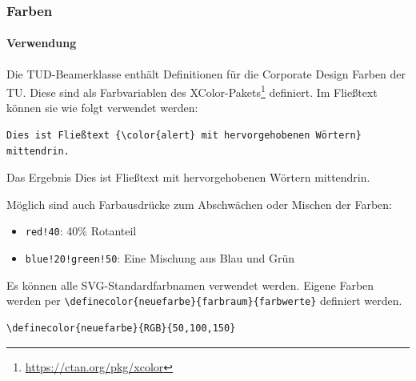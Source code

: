 \documentclass[german,notoc,draft]{tudbeamer}%
\begin{document}
\begin{frame}[fragile]
	\frametitle{Farben}
	\framesubtitle{Verwendung}

	Die TUD-Beamerklasse enthält Definitionen für die Corporate Design Farben der TU. Diese sind als Farbvariablen des XColor-Pakets\footnote{\url{https://ctan.org/pkg/xcolor}} definiert.
	Im Fließtext können sie wie folgt verwendet werden:	
	\begin{lstlisting}[gobble=4,style=latex,numbers=none]
		Dies ist Fließtext {\color{alert} mit hervorgehobenen Wörtern} mittendrin. 
	\end{lstlisting} 
	\begin{block}{Das Ergebnis}
	Dies ist Fließtext {\color{alert} mit hervorgehobenen Wörtern} mittendrin. 
	\end{block}
	Möglich sind auch Farbausdrücke zum Abschwächen oder Mischen der Farben: 
	\begin{itemize}
		\item \texttt{red!40}: 40\% Rotanteil
		\item \texttt{blue!20!green!50}: Eine Mischung aus Blau und Grün
	\end{itemize}
	Es können alle SVG-Standardfarbnamen verwendet werden. Eigene Farben werden per \texttt{\textbackslash definecolor\{neuefarbe\}\{farbraum\}\{farbwerte\}} definiert werden.
	\begin{lstlisting}[gobble=4,style=latex,numbers=none]
		\definecolor{neuefarbe}{RGB}{50,100,150}
	\end{lstlisting} 
\end{frame}
\end{document}
